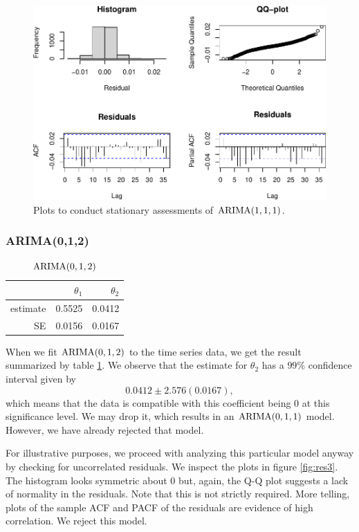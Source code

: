 \documentclass[final,
  11pt,
]{article}
\begin{document}
\begin{figure}
    \includegraphics{paper_files/figure-latex/unnamed-chunk-9-1.pdf}
    \caption{Plots to conduct stationary assessments of $\operatorname{ARIMA}(1,1,1)$.}
    \label{fig:resv}
\end{figure}

\hypertarget{ima12}{%
\subsubsection{ARIMA(0,1,2)}\label{ima12}}

\begin{table}
    \centering
    \caption{$\operatorname{ARIMA}(0,1,2)$}
    \begin{tabular}[t]{r r r}
        \hline
        &$\theta_1$ & $\theta_2$\\
        \hline
        estimate&	 0.5525 & 0.0412\\
        SE		&	 0.0156 & 0.0167\\
        \hline
    \end{tabular}
    \label{tbl:arima012}
\end{table}%

When we fit \(\operatorname{ARIMA}(0,1,2)\) to the time series data, we get the result
summarized by table \ref{tbl:arima012}.
We observe that the estimate for $\theta_2$ has a
$99\%$ confidence interval given by
$$
    0.0412 \pm 2.576 (0.0167),
$$
which means that the data is compatible with this coefficient being
$0$ at this significance level.
We may drop it, which results in an $\operatorname{ARIMA}(0,1,1)$ model.
However, we have already rejected that model.

For illustrative purposes, we proceed with analyzing this particular
model anyway by checking for uncorrelated residuals.
We inspect the plots in figure \ref{fig:res3}.
The histogram looks symmetric about \(0\) but, again, the Q-Q plot suggests a
lack of normality in the residuals. Note that this is not strictly
required. More telling, plots of the sample ACF and PACF of the
residuals are evidence of high correlation. We reject this model.
\end{document}
